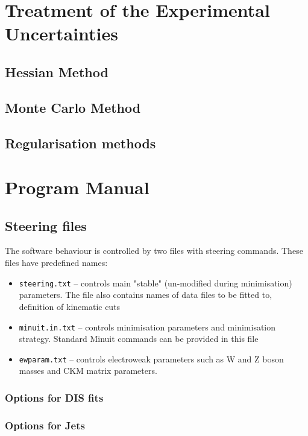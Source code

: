 \documentclass[11pt,a4paper]{article}
\begin{document}
\section{Treatment of the Experimental Uncertainties}
\subsection{Hessian Method}

\subsection{Monte Carlo Method}
\subsection{Regularisation methods}


\section{Program Manual}
\label{sec:man}
\subsection{Steering files}
    The software behaviour is controlled by two files with steering commands.
    These files have predefined names:
    \begin{itemize}
      \item {\tt steering.txt}  --   controls main "stable" (un-modified during 
                         minimisation) parameters. The file also contains
                         names of data files to be fitted to, definition 
                         of kinematic cuts                              
      \item {\tt minuit.in.txt}
                   --  controls minimisation parameters and minimisation 
                         strategy. Standard Minuit commands can be provided
                         in this file
      \item {\tt ewparam.txt}    --  controls electroweak parameters such
         as W and Z boson masses and CKM matrix parameters.
    \end{itemize}
\subsubsection{Options for DIS fits}
\subsubsection{Options for Jets}
\end{document}
